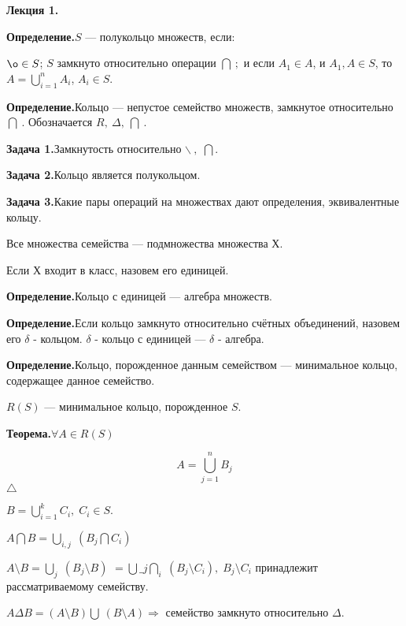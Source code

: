 



\begin{center}
\textbf{Лекция 1.}
\end{center}



\textbf{Определение.}\quad $S$ --- полукольцо множеств, если:

$\o \in S$; $S$ замкнуто относительно операции $\bigcap\:;$ и если
$A_1 \in A$, и $A_1, A \in S$, то $A = \bigcup_{i=1}^n{A_i}$,
$A_i\in S.$

\textbf{Определение.}\quad Кольцо --- непустое семейство множеств,
замкнутое относительно~$\bigcap\:.$ Обозначается $R,\:\Delta,\:
\bigcap\:.$

\textbf{Задача 1.}\quad Замкнутость относительно $\backslash\:,$
$\bigcap.$

\textbf{Задача 2.}\quad Кольцо является полукольцом.

\textbf{Задача 3.}\quad Какие пары операций на множествах дают
определения, эквивалентные кольцу.

Все множества семейства --- подмножества множества Х.

Если Х входит в класс, назовем его единицей.

\textbf{Определение.}\quad Кольцо с единицей --- алгебра множеств.


\textbf{Определение.}\quad Если кольцо замкнуто относительно
счётных объединений, назовем его $\delta$ - кольцом. $\delta$ -
кольцо с единицей --- $\delta$ - алгебра.

\textbf{Определение.}\quad Кольцо, порожденное данным семейством
--- минимальное кольцо, содержащее данное семейство.

$R(S)$ --- минимальное кольцо, порожденное $S$.

\textbf{Теорема.}\quad $\forall A \in R(S) $

$$ A = \bigcup_{j=1}^n B_j$$
$\triangle$

$B = \bigcup_{i=1}^k C_i, \; C_i \in S.$

$A\bigcap B = \bigcup_{i,j}\;(B_j\bigcap C_i)$

$A\setminus B = \bigcup _j \;(B_j \setminus B)$ $= \bigcup\_j
\bigcap_i\; (B_j \setminus C_i),\; B_j \setminus C_i$ принадлежит
рассматриваемому семейству.

$A\Delta B = (A\setminus B) \bigcup\: (B\setminus A) \Rightarrow$
семейство замкнуто относительно $\Delta.$



